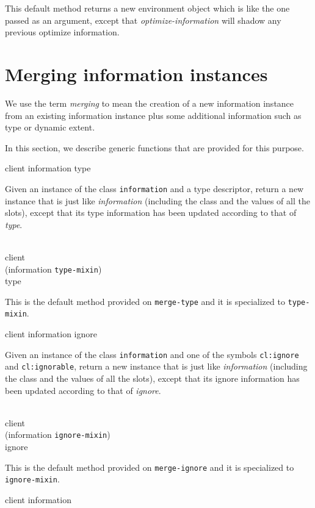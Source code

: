 This default method returns a new environment object which is like the
one passed as an argument, except that \textit{optimize-information}
will shadow any previous optimize information.

\section{Merging information instances}

We use the term \emph{merging} to mean the creation of a new
information instance from an existing information instance plus some
additional information such as type or dynamic extent.

In this section, we describe generic functions that are provided for
this purpose.

 {client information type}

Given an instance of the class \texttt{information} and a
type descriptor, return a new instance that is just like
\textit{information} (including the class and the values of
all the slots), except that its type information has been updated
according to that of \textit{type}.

\\
           {client\\
            (information {\tt type-mixin})\\
            type}

This is the default method provided on \texttt{merge-type}
and it is specialized to \texttt{type-mixin}.

 {client information ignore}

Given an instance of the class \texttt{information} and one
of the symbols \texttt{cl:ignore} and \texttt{cl:ignorable},
return a new instance that is just like
\textit{information} (including the class and the values of
all the slots), except that its ignore information has been updated
according to that of \textit{ignore}.

\\
           {client\\
            (information {\tt ignore-mixin})\\
            ignore}

This is the default method provided on \texttt{merge-ignore}
and it is specialized to \texttt{ignore-mixin}.

 {client information}

